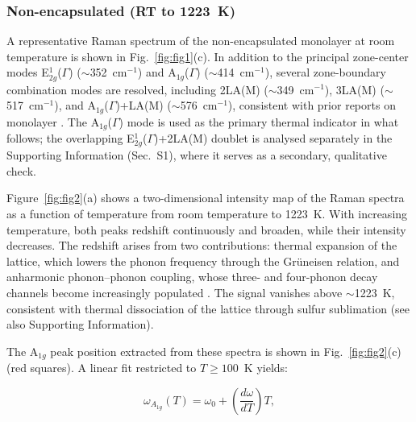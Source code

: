 \documentclass[letterpaper]{article}
\begin{document}
\subsubsection{Non-encapsulated  (RT to 1223~K)}

A representative Raman spectrum of the non-encapsulated  monolayer at
room temperature is shown in Fig.~\ref{fig:fig1}(c). In addition to the
principal zone-center modes E$^1_{2g}$($\Gamma$) ($\sim$352~cm$^{-1}$) and
A$_{1g}$($\Gamma$) ($\sim$414~cm$^{-1}$), several zone-boundary combination
modes are resolved, including 2LA(M) ($\sim$349~cm$^{-1}$), 3LA(M)
($\sim$517~cm$^{-1}$), and A$_{1g}$($\Gamma$)+LA(M) ($\sim$576~cm$^{-1}$),
consistent with prior reports on monolayer  \cite{berkdemir-2013}.
The A$_{1g}$($\Gamma$) mode is used as the primary thermal indicator in what
follows; the overlapping E$^1_{2g}$($\Gamma$)+2LA(M) doublet is analysed
separately in the Supporting Information (Sec.~S1), where it serves as a
secondary, qualitative check.

Figure~\ref{fig:fig2}(a) shows a two-dimensional intensity map of the Raman
spectra as a function of temperature from room temperature to 1223~K.
With increasing temperature, both peaks redshift continuously and broaden,
while their intensity decreases. The redshift arises from two contributions:
thermal expansion of the lattice, which lowers the phonon frequency through the
Grüneisen relation, and anharmonic phonon--phonon coupling, whose three- and
four-phonon decay channels become increasingly populated \cite{huang-2016}. The signal vanishes above
$\sim$1223~K, consistent with thermal dissociation of the
 lattice through sulfur sublimation \cite{brainard-1968} (see also
Supporting Information).

The A$_{1g}$ peak position extracted from these spectra is shown in
Fig.~\ref{fig:fig2}(c) (red squares). A linear fit restricted to $T \geq 100$~K
yields:

\begin{equation}
\omega_{A_{1g}}(T) = \omega_0 + \left(\frac{d\omega}{dT}\right) T,
\end{equation}
\end{document}
